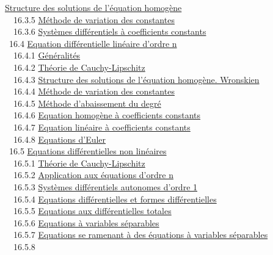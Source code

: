 \documentclass[]{article}
\begin{document}
\href{coursse88.html\#x107-48300016.3.4}{Structure des solutions de
l'équation homogène} \\ ~~16.3.5
\href{coursse88.html\#x107-48400016.3.5}{Méthode de variation des
constantes} \\ ~~16.3.6
\href{coursse88.html\#x107-48500016.3.6}{Systèmes différentiels à
coefficients constants} \\ ~16.4
\href{coursse89.html\#x108-48600016.4}{Equation différentielle linéaire
d'ordre n} \\ ~~16.4.1
\href{coursse89.html\#x108-48700016.4.1}{Généralités} \\ ~~16.4.2
\href{coursse89.html\#x108-48800016.4.2}{Théorie de Cauchy-Lipschitz} \\
~~16.4.3 \href{coursse89.html\#x108-48900016.4.3}{Structure des
solutions de l'équation homogène. Wronskien} \\ ~~16.4.4
\href{coursse89.html\#x108-49000016.4.4}{Méthode de variation des
constantes} \\ ~~16.4.5 \href{coursse89.html\#x108-49100016.4.5}{Méthode
d'abaissement du degré} \\ ~~16.4.6
\href{coursse89.html\#x108-49200016.4.6}{Equation homogène à
coefficients constants} \\ ~~16.4.7
\href{coursse89.html\#x108-49300016.4.7}{Equation linéaire à
coefficients constants} \\ ~~16.4.8
\href{coursse89.html\#x108-49400016.4.8}{Equations d'Euler} \\ ~16.5
\href{coursse90.html\#x109-49500016.5}{Equations différentielles non
linéaires} \\ ~~16.5.1 \href{coursse90.html\#x109-49600016.5.1}{Théorie
de Cauchy-Lipschitz} \\ ~~16.5.2
\href{coursse90.html\#x109-49700016.5.2}{Application aux équations
d'ordre n} \\ ~~16.5.3 \href{coursse90.html\#x109-49800016.5.3}{Systèmes
différentiels autonomes d'ordre 1} \\ ~~16.5.4
\href{coursse90.html\#x109-49900016.5.4}{Equations différentielles et
formes différentielles} \\ ~~16.5.5
\href{coursse90.html\#x109-50000016.5.5}{Equations aux différentielles
totales} \\ ~~16.5.6 \href{coursse90.html\#x109-50100016.5.6}{Equations
à variables séparables} \\ ~~16.5.7
\href{coursse90.html\#x109-50200016.5.7}{Equations se ramenant à des
équations à variables séparables} \\ ~~16.5.8
\end{document}

